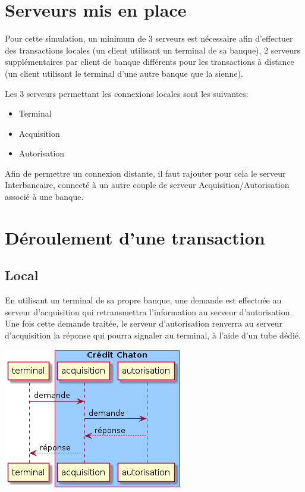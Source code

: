 \documentclass[french, a4paper, 12pt, titlepage]{article}
\begin{document}
\section{Serveurs mis en place}
Pour cette simulation, un minimum de 3 serveurs est nécessaire afin d'effectuer des transactions locales
(un client utilisant un terminal de sa banque),
2 serveurs supplémentaires par client de banque différents pour les transactions à distance (un client utilisant le terminal d'une autre banque que la sienne).

Les 3 serveurs permettant les connexions locales sont les suivantes:

\begin{itemize}
\item Terminal
\item Acquisition
\item Autorisation
\end{itemize}

Afin de permettre un connexion distante, il faut rajouter pour cela le serveur Interbancaire, connecté à un autre couple de serveur Acquisition/Autorisation associé à une banque.

\section{Déroulement d'une transaction}
\subsection{Local}
En utilisant un terminal de sa propre banque, une demande est effectuée au serveur d'acquisition qui retransmettra l'information au serveur d'autorisation.
Une fois cette demande traitée, le serveur d'autorisation renverra au serveur d'acquisition la réponse qui pourra signaler au terminal, à l'aide d'un tube dédié.
\medskip
\begin{center}
\includegraphics[scale=0.7]{transactionLocal}
\end{center}
\medskip
\end{document}
